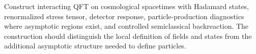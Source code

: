 \begin{openproblem}
\label{op:interacting-cosmological-qft}
Construct interacting QFT on cosmological spacetimes with Hadamard states,
renormalized stress tensor, detector response, particle-production
diagnostics where asymptotic regions exist, and controlled semiclassical
backreaction.  The construction should distinguish the local definition of
fields and states from the additional asymptotic structure needed to define
particles.
\end{openproblem}
